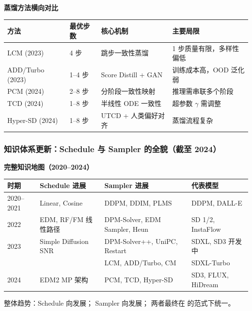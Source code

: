 \begin{summarybox}
\textbf{蒸馏方法横向对比}
\renewcommand{\arraystretch}{1.6}
\begin{tabular}{p{3cm}p{2.5cm}p{3cm}p{4.5cm}}
\hline
\textbf{方法} & \textbf{最优步数} & \textbf{核心机制} & \textbf{主要局限} \\
\hline
LCM (2023)      & 4 步        & 跳步一致性蒸馏      & 1 步质量有限，多样性偏低 \\
ADD/Turbo (2023) & 1--4 步    & Score Distill + GAN & 训练成本高，OOD 泛化弱 \\
PCM (2024)      & 2--8 步     & 分阶段一致性映射    & 推理需串联多个阶段 \\
TCD (2024)      & 1--8 步     & 半线性 ODE 一致性   & 超参数 $\gamma$ 需调整 \\
Hyper-SD (2024) & 1--8 步     & UTCD + 人类偏好对齐 & 蒸馏流程复杂 \\
\hline
\end{tabular}
\end{summarybox}

\subsubsection{知识体系更新：Schedule 与 Sampler 的全貌（截至 2024）}

\begin{summarybox}
\textbf{完整知识地图（2020--2024）}

\renewcommand{\arraystretch}{1.5}
\begin{tabular}{p{3cm}p{3.5cm}p{3.5cm}p{3cm}}
\hline
\textbf{时期} & \textbf{Schedule 进展} & \textbf{Sampler 进展} & \textbf{代表模型} \\
\hline
2020--2021 & Linear, Cosine        & DDPM, DDIM, PLMS    & DDPM, DALL-E \\
2022       & EDM, RF/FM 线性路径   & DPM-Solver, EDM Sampler, Heun & SD 1/2, InstaFlow \\
2023       & Simple Diffusion SNR  & DPM-Solver++, UniPC, Restart & SDXL, SD3 开发中 \\
           &                       & LCM, ADD/Turbo, CM  & SDXL-Turbo \\
2024       & EDM2 MP 架构          & PCM, TCD, Hyper-SD  & SD3, FLUX, HiDream \\
\hline
\end{tabular}

\medskip
整体趋势：Schedule 向发展；
Sampler 向发展；
两者最终在  的范式下统一。
\end{summarybox}
